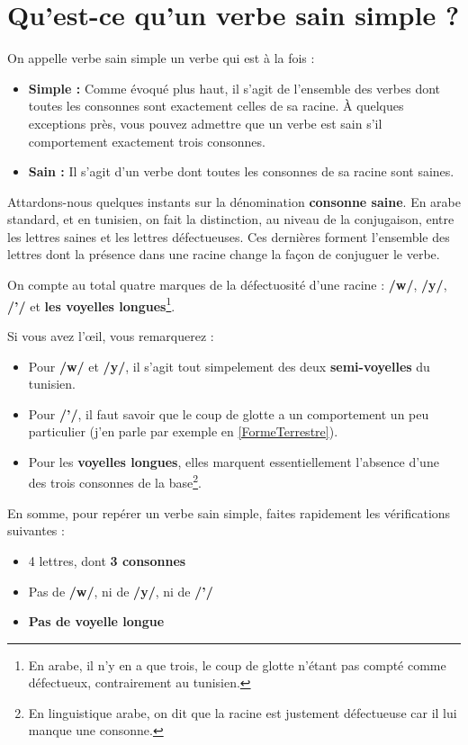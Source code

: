 \section{Qu'est-ce qu'un verbe sain simple ?}
On appelle verbe sain simple un verbe qui est à la fois : 
\begin{itemize}
    \item \textbf{Simple :} Comme évoqué plus haut, il s'agit de l'ensemble des verbes dont toutes les consonnes sont exactement celles de sa racine. À quelques exceptions près, vous pouvez admettre que un verbe est sain s'il comportement exactement trois consonnes.
    \item \textbf{Sain :} Il s'agit d'un verbe dont toutes les consonnes de sa racine sont saines.
\end{itemize}

Attardons-nous quelques instants sur la dénomination \textbf{consonne saine}. En arabe standard, et en tunisien, on fait la distinction, au niveau de la conjugaison, entre les lettres saines et les lettres défectueuses. Ces dernières forment l'ensemble des lettres dont la présence dans une racine change la façon de conjuguer le verbe. 

On compte au total quatre marques de la défectuosité d'une racine : \textbf{/w/}, \textbf{/y/}, \textbf{/'/} et \textbf{les voyelles longues}\footnote{En arabe, il n'y en a que trois, le coup de glotte n'étant pas compté comme défectueux, contrairement au tunisien.}. 

Si vous avez l'\oe il, vous remarquerez : 

\begin{itemize}
    \item Pour \textbf{/w/} et \textbf{/y/}, il s'agit tout simpelement des deux \textbf{semi-voyelles} du tunisien.
    \item Pour \textbf{/'/}, il faut savoir que le coup de glotte a un comportement un peu particulier (j'en parle par exemple en \ref{FormeTerrestre}).
    \item Pour les \textbf{voyelles longues}, elles marquent essentiellement l'absence d'une des trois consonnes de la base\footnote{En linguistique arabe, on dit que la racine est justement défectueuse car il lui manque une consonne.}.
\end{itemize}

En somme, pour repérer un verbe sain simple, faites rapidement les vérifications suivantes :
\begin{itemize}
    \item 4 lettres, dont \textbf{3 consonnes}
    \item Pas de \textbf{/w/},  ni de \textbf{/y/}, ni de \textbf{/'/}
    \item \textbf{Pas de voyelle longue}

\end{itemize}

